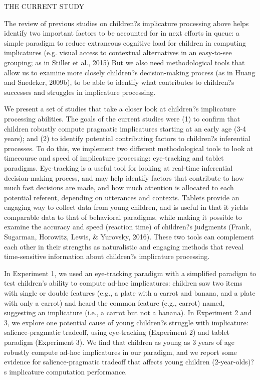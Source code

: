 THE CURRENT STUDY

The review of previous studies on children?s implicature processing above helps identify two important factors to be accounted for in next efforts in queue: a simple paradigm to reduce extraneous cognitive load for children in computing implicatures (e.g. visual access to contextual alternatives in an easy-to-see grouping; as in Stiller et al., 2015) But we also need methodological tools that allow us to examine more closely children?s decision-making process (as in Huang and Snedeker, 2009b), to be able to identify what contributes to children?s successes and struggles in implicature processing. 

We present a set of studies that take a closer look at children?s implicature processing abilities. The goals of the current studies were (1) to confirm that children robustly compute pragmatic implicatures starting at an early age (3-4 years); and (2) to identify potential contributing factors to children?s inferential processes. To do this, we implement two different methodological tools to look at timecourse and speed of implicature processing: eye-tracking and tablet paradigms. Eye-tracking is a useful tool for looking at real-time inferential decision-making process, and may help identify factors that contribute to how much fast decisions are made, and how much attention is allocated to each potential referent, depending on utterances and contexts. Tablets provide an engaging way to collect data from young children, and is useful in that it yields comparable data to that of behavioral paradigms, while making it possible to examine the accuracy and speed (reaction time) of children?s judgments (Frank, Sugarman, Horowitz, Lewis, & Yurovsky, 2016). These two tools can complement each other in their strengths as naturalistic and engaging methods that reveal time-sensitive information about children?s implicature processing.

In Experiment 1, we used an eye-tracking paradigm with a simplified paradigm to test children's ability to compute ad-hoc implicatures: children saw two items with single or double features (e.g., a plate with a carrot and banana, and a plate with only a carrot) and heard the common feature (e.g., carrot) named, suggesting an implicature (i.e., a carrot but not a banana). In Experiment 2 and 3, we explore one potential cause of young children?s struggle with implicature: salience-pragmatic tradeoff, using eye-tracking (Experiment 2) and tablet paradigm (Experiment 3). We find that children as young as 3 years of age robustly compute ad-hoc implicatures in our paradigm, and we report some evidence for salience-pragmatic tradeoff that affects young children (2-year-olds)?s implicature computation performance.

